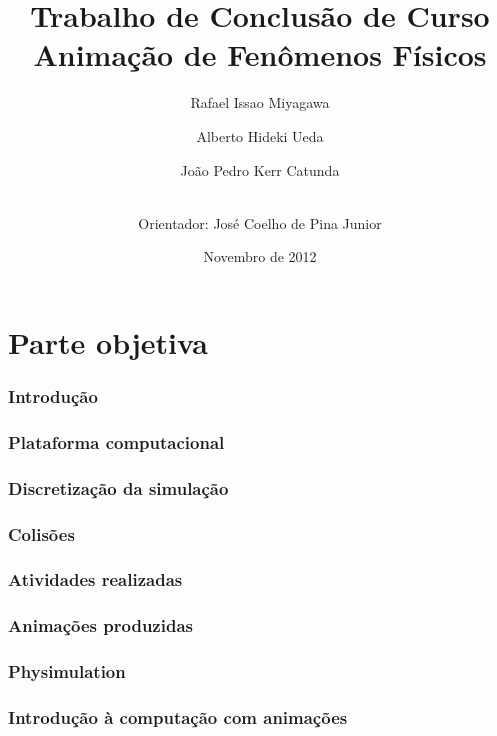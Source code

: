 \documentclass[a4paper,12pt,titlepage]{article}
\title{Trabalho de Conclusão de Curso \\
Animação de Fenômenos Físicos}
\author{Rafael Issao Miyagawa \and Alberto Hideki Ueda \and 
		João Pedro Kerr Catunda \\ \ \and
        Orientador: José Coelho de Pina Junior }
\date{Novembro de 2012}
\begin{document}
\maketitle
\tableofcontents
\pagebreak

\part{Parte objetiva}

\section{Introdução} \label{introducao}

\newpage

\section{Plataforma computacional} \label{plataforma}

\newpage

\section{Discretização da simulação} \label{discretizacao}

\newpage

\section{Colisões} \label{colisoes}

\newpage

\section{Atividades realizadas} \label{atividades}

\newpage

\section{Animações produzidas} \label{animacoes}

\newpage

\section{Physimulation} \label{physimulation}

\newpage

\section{Introdução à computação com animações} \label{ep}

\newpage
\end{document}

